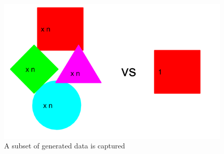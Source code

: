 \begin{figure}
  \includegraphics[scale=0.6]{figures/data_captured}
  \caption{A subset of generated data is captured}
  \label{data_captured}
\end{figure}

